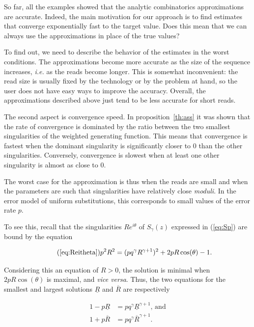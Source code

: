 \documentclass{article}
\begin{document}
So far, all the examples showed that the analytic combinatorics
approximations are accurate. Indeed, the main motivation for our approach
is to find estimates that converge exponentially fast to the target value.
Does this mean that we can always use the approximations in place of the
true values?

To find out, we need to describe the behavior of the estimates in the
worst conditions. The approximations become more accurate as the size of
the sequence increases, \textit{i.e.} as the reads become longer. This is
somewhat inconvenient: the read size is usually fixed by the technology or
by the problem at hand, so the user does not have easy ways to improve the
accuracy. Overall, the approximations described above just tend to be less
accurate for short reads.

The second aspect is convergence speed. In proposition~\ref{th:ass} it
was shown that the rate of convergence is dominated by the ratio between
the two smallest singularities of the weighted generating function. This
means that convergence is fastest when the dominant singularity is
significantly closer to $0$ than the other singularities. Conversely,
convergence is slowest when at least one other singularity is almost as
close to $0$.

The worst case for the approximation is thus when the reads are small and
when the parameters are such that singularities have relatively close
\textit{moduli}. In the error model of uniform substitutions, this
corresponds to small values of the error rate $p$.

To see this, recall that the singularities $Re^{i\theta}$ of $S_\gamma(z)$
expressed in (\ref{eq:Sp}) are bound by the equation

\begin{equation}
\tag{\ref{eq:Reitheta}}
p^2R^2 = (pq^\gamma R^{\gamma+1})^2 + 2pR \cos(\theta) -1.
\end{equation}

Considering this an equation of $R > 0$, the solution is minimal when
$2pR\cos(\theta)$ is maximal, and \textit{vice versa}. Thus, the two
equations for the smallest and largest solutions $\underline{R}$ and
$\overline{R}$ are respectively

\begin{align*}
1-p\underline{R} &= pq^\gamma \underline{R}^{\gamma+1}\text{, and} \\
1+p\overline{R} &= pq^\gamma \overline{R}^{\gamma+1}.
\end{align*}
\end{document}
